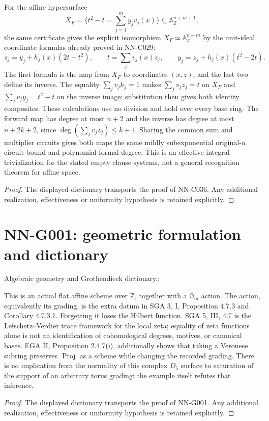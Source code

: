 \begin{geometricstatement}[NN-C036]
For the affine hypersurface
\[
 X_F=\{t^2-t=\sum_{j=1}^m y_jv_j(x)\}
                          \subseteq\mathbb A^{n+m+1}_{\mathbb Z},
\]
the same certificate gives the explicit isomorphism
$X_F\simeq\mathbb A^{n+m}_{\mathbb Z}$ by the unit-ideal
coordinate formulas already proved in NN-C029:
\[
 z_j=y_j+h_j(x)(2t-t^2),\qquad
 t=\sum_jv_j(x)z_j,\qquad
 y_j=z_j+h_j(x)(t^2-2t).
\]
The first formula is the map from $X_F$ to coordinates
$(x,z)$, and the last two define its inverse.  The equality
$\sum_jv_jh_j=1$ makes $\sum_jv_jz_j=t$ on $X_F$ and
$\sum_jv_jy_j=t^2-t$ on the inverse image; substitution
then gives both identity composites.  These calculations
use no division and hold over every base ring.  The forward
map has degree at most $n+2$ and the inverse has degree at
most $n+2k+2$, since $\deg(\sum_jv_jz_j)\le k+1$.
Sharing the common sum and multiplier circuits gives both
maps the same mildly subexponential original-$n$ circuit
bound and polynomial formal degree.  This is an effective
integral trivialization for the stated empty clause systems,
not a general recognition theorem for affine space.
\end{geometricstatement}
\begin{proof} The displayed dictionary transports the proof of NN-C036. Any additional realization, effectiveness or uniformity hypothesis is retained explicitly.\end{proof}


\section{NN-G001: geometric formulation and dictionary}
\begin{geometricstatement}[NN-G001]
Algebraic geometry and Grothendieck dictionary.:

This is an actual flat affine scheme over $\mathbb Z$, together with a
$\mathbb G_m$ action. The action, equivalently its grading, is the
extra datum in SGA 3, I, Proposition 4.7.3 and Corollary 4.7.3.1.
Forgetting it loses the Hilbert function. SGA 5, III, 4.7 is the
Lefschetz--Verdier trace framework for the local zeta; equality of
zeta functions alone is not an identification of cohomological
degrees, motives, or canonical bases. EGA II, Proposition 2.4.7(i),
additionally shows that taking a Veronese subring preserves
$\operatorname{Proj}$ as a scheme while changing the recorded grading.
There is no implication from the normality of this complex $D_5$
surface to saturation of the support of an arbitrary torus grading:
the example itself refutes that inference.


\end{geometricstatement}
\begin{proof} The displayed dictionary transports the proof of NN-G001. Any additional realization, effectiveness or uniformity hypothesis is retained explicitly.\end{proof}


